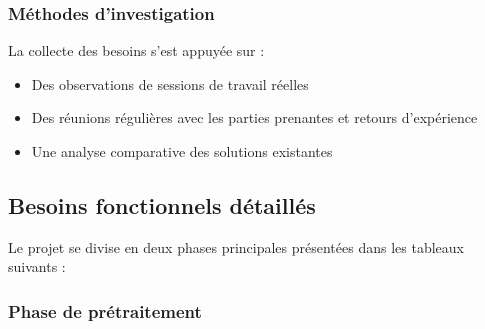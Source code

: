 \documentclass[12pt,a4paper]{report}
\begin{document}
\subsubsection{Méthodes d'investigation}

La collecte des besoins s'est appuyée sur :
\begin{itemize}
\item Des observations de sessions de travail réelles
\item Des réunions régulières avec les parties prenantes et retours d'expérience
\item Une analyse comparative des solutions existantes
\end{itemize}

\subsection{Besoins fonctionnels détaillés}

Le projet se divise en deux phases principales présentées dans les tableaux suivants :

\subsubsection{Phase de prétraitement}
\end{document}

